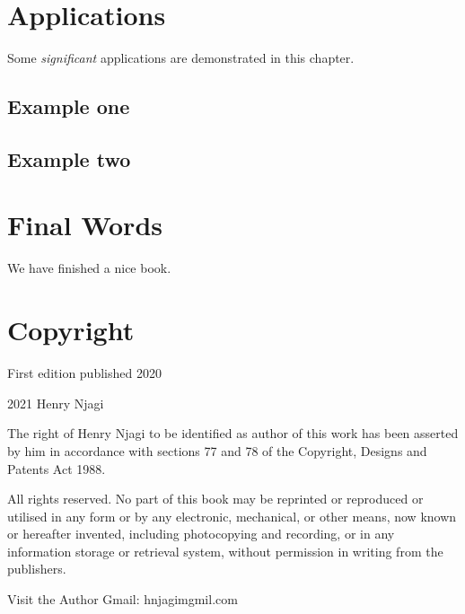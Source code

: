 \documentclass[
]{book}
\begin{document}
\hypertarget{applications}{%
\chapter{Applications}\label{applications}}

Some \emph{significant} applications are demonstrated in this chapter.

\hypertarget{example-one}{%
\section{Example one}\label{example-one}}

\hypertarget{example-two}{%
\section{Example two}\label{example-two}}

\hypertarget{final-words}{%
\chapter{Final Words}\label{final-words}}

We have finished a nice book.

\hypertarget{copyright}{%
\chapter{Copyright}\label{copyright}}

First edition published 2020

2021 Henry Njagi

The right of Henry Njagi to be identified as author of this work has been asserted by him in accordance with sections 77 and 78 of the Copyright, Designs and Patents Act 1988.

All rights reserved. No part of this book may be reprinted or reproduced or utilised in any form or by any electronic, mechanical, or other means, now known or hereafter invented, including photocopying and recording, or in any information storage or retrieval system, without permission in writing from the publishers.

Visit the Author Gmail: hnjagimgmil.com

  
\end{document}
